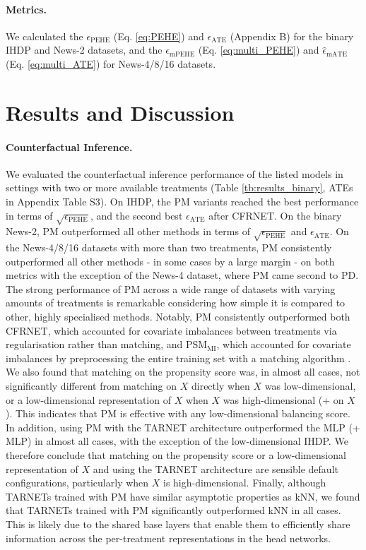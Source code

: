 \documentclass{article}
\begin{document}
\paragraph{Metrics.} We calculated the $\epsilon_\text{PEHE}$ (Eq. \ref{eq:PEHE}) and $\epsilon_\text{ATE}$ (Appendix B) for the binary IHDP and News-2 datasets, and the $\hat\epsilon_\text{mPEHE}$ (Eq. \ref{eq:multi_PEHE}) and $\hat\epsilon_\text{mATE}$ (Eq. \ref{eq:multi_ATE}) for News-4/8/16 datasets. 

\section{Results and Discussion}
\paragraph{Counterfactual Inference.} We evaluated the counterfactual inference performance of the listed models in settings with two or more available treatments (Table \ref{tb:results_binary}, ATEs in Appendix Table S3). On IHDP, the PM variants reached the best performance in terms of $\sqrt{\epsilon_\text{PEHE}}$, and the second best ${\epsilon_\text{ATE}}$ after CFRNET. On the binary News-2, PM outperformed all other methods in terms of $\sqrt{\epsilon_\text{PEHE}}$ and ${\epsilon_\text{ATE}}$. On the News-4/8/16 datasets with more than two treatments, PM consistently outperformed all other methods - in some cases by a large margin - on both metrics with the exception of the News-4 dataset, where PM came second to PD. The strong performance of PM across a wide range of datasets with varying amounts of treatments is remarkable considering how simple it is compared to other, highly specialised methods. Notably, PM consistently outperformed both CFRNET, which accounted for covariate imbalances between treatments via regularisation rather than matching, and PSM$_\text{MI}$, which accounted for covariate imbalances by preprocessing the entire training set with a matching algorithm \cite{ho2011matchit}. We also found that matching on the propensity score was, in almost all cases, not significantly different from matching on $X$ directly when $X$ was low-dimensional, or a low-dimensional representation of $X$ when $X$ was high-dimensional (+ on $X$). This indicates that PM is effective with any low-dimensional balancing score. In addition, using PM with the TARNET architecture outperformed the MLP (+ MLP) in almost all cases, with the exception of the low-dimensional IHDP. We therefore conclude that matching on the propensity score or a low-dimensional representation of $X$ and using the TARNET architecture are sensible default configurations, particularly when $X$ is high-dimensional. Finally, although TARNETs trained with PM have similar asymptotic properties as kNN, we found that TARNETs trained with PM significantly outperformed kNN in all cases. This is likely due to the shared base layers that enable them to efficiently share information across the per-treatment representations in the head networks.
\end{document}
